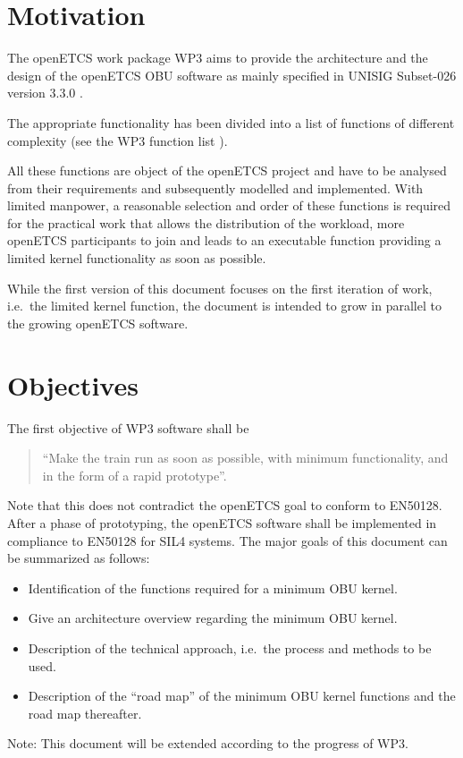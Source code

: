 \documentclass{template/openetcs_report}
\begin{document}
\section{Motivation}
\label{sec:Motivation}

The openETCS work package WP3 aims to provide the architecture and the design of the openETCS OBU software as mainly specified in UNISIG Subset-026 version 3.3.0 \cite{subset-026}. 

The appropriate functionality has been divided into a list of functions of different complexity (see the WP3 function list \cite{functions}).

All these functions are object of the openETCS project and have to be analysed from their requirements and subsequently modelled and implemented. With limited manpower, a reasonable selection and order of these functions is required for the practical work that allows the distribution of the workload, more openETCS participants to join and leads to an executable function providing a limited kernel functionality as soon as possible. 

While the first version of this document focuses on the first iteration of work, i.e.~the limited kernel function, the document is intended to grow in parallel to the growing openETCS software.


\section{Objectives}
\label{sec:Objectives}


The first objective of WP3 software shall be
\begin{quote}
	``Make the train run as soon as possible, with minimum functionality, and in the form of a rapid prototype''.
\end{quote}
Note that this does not contradict the openETCS goal to conform to EN50128. After a phase of prototyping, the openETCS software shall be implemented in compliance to EN50128 for SIL4 systems. The major goals of this document can be summarized as follows:
\begin{itemize}
	\item Identification of the functions required for a minimum OBU kernel.
	\item Give an architecture overview regarding the minimum OBU kernel.
	\item Description of the technical approach, i.e.~the process and methods to be used.
	\item Description of the ``road map'' of the minimum OBU kernel functions and the road map thereafter.
\end{itemize}
Note: This document will be extended according to the progress of WP3. 
\end{document}
